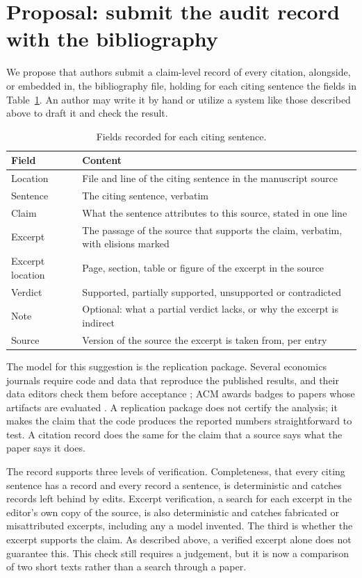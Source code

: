 \documentclass[11pt]{article}
\begin{document}
\section{Proposal: submit the audit record with the bibliography}

We propose that authors submit a claim-level record of every citation, alongside, or embedded in, the bibliography file, holding for each citing sentence the fields in Table~\ref{tab:fields}. An author may write it by hand or utilize a system like those described above to draft it and check the result.

\begin{table}[t]
\centering
\caption{Fields recorded for each citing sentence.}
\label{tab:fields}
\begin{tabularx}{\linewidth}{@{}lX@{}}
\toprule
Field & Content \\
\midrule
Location & File and line of the citing sentence in the manuscript source \\
Sentence & The citing sentence, verbatim \\
Claim & What the sentence attributes to this source, stated in one line \\
Excerpt & The passage of the source that supports the claim, verbatim, with elisions marked \\
Excerpt location & Page, section, table or figure of the excerpt in the source \\
Verdict & Supported, partially supported, unsupported or contradicted \\
Note & Optional: what a partial verdict lacks, or why the excerpt is indirect \\
Source & Version of the source the excerpt is taken from, per entry \\
\bottomrule
\end{tabularx}
\end{table}

The model for this suggestion is the replication package. Several economics journals require code and data that reproduce the published results, and their data editors check them before acceptance \citep{aea2026datapolicy,es2026reproducibility}; ACM awards badges to papers whose artifacts are evaluated \citep{acm2020badging}. A replication package does not certify the analysis; it makes the claim that the code produces the reported numbers straightforward to test. A citation record does the same for the claim that a source says what the paper says it does.

The record supports three levels of verification. Completeness, that every citing sentence has a record and every record a sentence, is deterministic and catches records left behind by edits. Excerpt verification, a search for each excerpt in the editor's own copy of the source, is also deterministic and catches fabricated or misattributed excerpts, including any a model invented. The third is whether the excerpt supports the claim. As described above, a verified excerpt alone does not guarantee this. This check still requires a judgement, but it is now a comparison of two short texts rather than a search through a paper.
\end{document}
